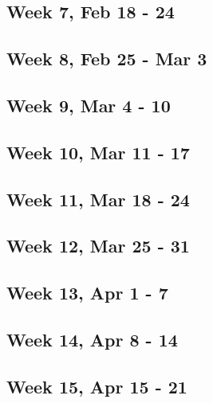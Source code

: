 \documentclass{article}
\begin{document}
\subsection{Week 7, Feb 18 - 24}

\subsection{Week 8, Feb 25 - Mar 3}

\subsection{Week 9, Mar 4 - 10}

\subsection{Week 10, Mar 11 - 17}

\subsection{Week 11, Mar 18 - 24}

\subsection{Week 12, Mar 25 - 31}

\subsection{Week 13, Apr 1 - 7}

\subsection{Week 14, Apr 8 - 14}

\subsection{Week 15, Apr 15 - 21}
\end{document}
